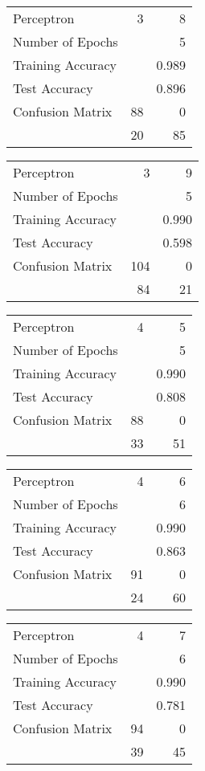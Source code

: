 \documentclass[11pt]{article}
\begin{document}
\begin{minipage}[t]{0.5\textwidth}
\begin{tabular}{|l | r r|}
\hline Perceptron & 3 & 8\\
Number of Epochs & & 5\\
Training Accuracy & & 0.989\\
Test Accuracy & & 0.896\\
Confusion Matrix & 88 & 0\\
 &20 & 85\\ \hline
\end{tabular}
\end{minipage}
\begin{minipage}[t]{0.5\textwidth}
\begin{tabular}{|l | r r|}
\hline Perceptron & 3 & 9\\
Number of Epochs & & 5\\
Training Accuracy & & 0.990\\
Test Accuracy & & 0.598\\
Confusion Matrix & 104 & 0\\
 &84 & 21\\ \hline
\end{tabular}
\end{minipage}
\begin{minipage}[t]{0.5\textwidth}
\begin{tabular}{|l | r r|}
\hline Perceptron & 4 & 5\\
Number of Epochs & & 5\\
Training Accuracy & & 0.990\\
Test Accuracy & & 0.808\\
Confusion Matrix & 88 & 0\\
 &33 & 51\\ \hline
\end{tabular}
\end{minipage}
\begin{minipage}[t]{0.5\textwidth}
\begin{tabular}{|l | r r|}
\hline Perceptron & 4 & 6\\
Number of Epochs & & 6\\
Training Accuracy & & 0.990\\
Test Accuracy & & 0.863\\
Confusion Matrix & 91 & 0\\
 &24 & 60\\ \hline
\end{tabular}
\end{minipage}
\begin{minipage}[t]{0.5\textwidth}
\begin{tabular}{|l | r r|}
\hline Perceptron & 4 & 7\\
Number of Epochs & & 6\\
Training Accuracy & & 0.990\\
Test Accuracy & & 0.781\\
Confusion Matrix & 94 & 0\\
 &39 & 45\\ \hline
\end{tabular}
\end{minipage}
\end{document}
